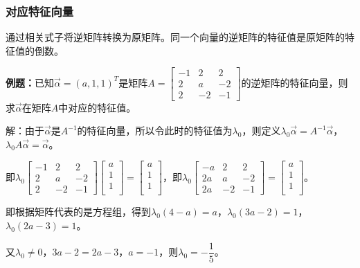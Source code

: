 \subsubsection{对应特征向量}

通过相关式子将逆矩阵转换为原矩阵。同一个向量的逆矩阵的特征值是原矩阵的特征值的倒数。

\textbf{例题：}已知$\overrightarrow{\alpha}=(a,1,1)^T$是矩阵$A=\left[\begin{array}{ccc}
    -1 & 2 & 2 \\
    2 & a & -2 \\
    2 & -2 & -1
\end{array}\right]$的逆矩阵的特征向量，则求$\overrightarrow{\alpha}$在矩阵$A$中对应的特征值。

解：由于$\overrightarrow{\alpha}$是$A^{-1}$的特征向量，所以令此时的特征值为$\lambda_0$，则定义$\lambda_0\overrightarrow{\alpha}=A^{-1}\overrightarrow{\alpha}$，$\lambda_0A\overrightarrow{\alpha}=\overrightarrow{\alpha}$。

即$\lambda_0\left[\begin{array}{ccc}
    -1 & 2 & 2 \\
    2 & a & -2 \\
    2 & -2 & -1
\end{array}\right]\left[\begin{array}{c}
    a \\
    1 \\
    1 \\
\end{array}\right]=\left[\begin{array}{c}
    a \\
    1 \\
    1 \\
\end{array}\right]$，即$\lambda_0\left[\begin{array}{ccc}
    -a & 2 & 2 \\
    2a & a & -2 \\
    2a & -2 & -1
\end{array}\right]=\left[\begin{array}{c}
    a \\
    1 \\
    1 \\
\end{array}\right]$。\medskip

即根据矩阵代表的是方程组，得到$\lambda_0(4-a)=a$，$\lambda_0(3a-2)=1$，$\lambda_0(2a-3)=1$。

又$\lambda_0\neq0$，$3a-2=2a-3$，$a=-1$，则$\lambda_0=-\dfrac{1}{5}$。

